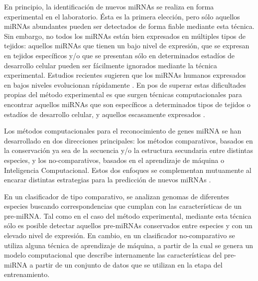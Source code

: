 \documentclass[12pt,bibliography=oldstyle,DIV=12,parskip=full-,titlepage]{scrartcl}
\begin{document}
%
%
En principio, la identificación de nuevos miRNAs se realiza en forma
experimental en el laboratorio. Ésta es la primera elección, pero sólo
aquellos miRNAs abundantes pueden ser detectados de forma fiable
mediante esta técnica. Sin embargo, no todos los miRNAs están bien
expresados en múltiples tipos de tejidos: aquellos miRNAs que tienen
un bajo nivel de expresión, que se expresan en tejidos específicos y/o
que se presentan sólo en determinados estadíos de desarrollo celular
pueden ser fácilmente ignorados mediante la técnica
experimental. Estudios recientes sugieren que los miRNAs humanos
expresados en bajos niveles evolucionan rápidamente
\cite{ding}\cite{xu}. En pos de superar estas dificultades propias
del método experimental es que surgen técnicas computacionales para
encontrar aquellos miRNAs que son específicos a determinados tipos de
tejidos o estadíos de desarrollo celular, y aquellos escasamente
expresados \cite{sheng}\cite{xu}.

Los métodos computacionales para el reconocimiento de genes miRNA se
han desarrollado en dos direcciones principales: los métodos
comparativos, basados en la conservación ya sea de la secuencia y/o la
estructura secundaria entre distintas especies, y los no-comparativos,
basados en el aprendizaje de máquina o Inteligencia
Computacional. Estos dos enfoques se complementan mutuamente al
encarar distintas estrategias para la predicción de nuevos
miRNAs \cite{batuwita}\cite{sheng}.

En un clasificador de tipo comparativo, se analizan genomas de
diferentes especies buscando correspondencias que cumplan con las
características de un pre-miRNA. Tal como en el caso del método
experimental, mediante esta técnica sólo es posible detectar aquellos
pre-miRNAs conservados entre especies y con un elevado nivel de
expresión. En cambio, en un clasificador no-comparativo se utiliza
alguna técnica de aprendizaje de máquina, a partir de la cual se
genera un modelo computacional que describe internamente las
características del pre-miRNA a partir de un conjunto de datos que se
utilizan en la etapa del entrenamiento.
\end{document}
